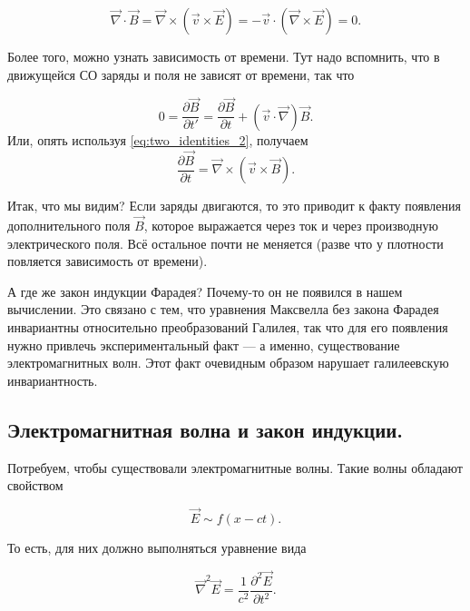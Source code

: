 \documentclass[12pt]{article}
\newcommand{\pt}{\partial}
\newcommand{\vn}{\vec{\nabla}}
\begin{document}
\begin{equation}
  \label{eq:B_field_div}
  \vn \cdot \vec{B} = \vn \times \left( \vec{v} \times \vec{E} \right)
  = - \vec{v} \cdot \left( \vn \times \vec{E} \right)=0.
\end{equation}

Более того, можно узнать зависимость от времени. Тут надо вспомнить,
что в движущейся СО заряды и поля не зависят от времени, так что

\begin{equation}
  \label{eq:B_field_pt_t}
  0=\frac{\pt \vec{B}}{\pt t'} = \frac{\pt \vec{B}}{\pt t} + \left( \vec{v}
    \cdot \vn \right) \vec{B}.
\end{equation}
Или, опять используя \eqref{eq:two_identities_2}, получаем
\begin{equation}
  \frac{\pt \vec{B}}{\pt t} = \vn \times \left( \vec{v} \times \vec{B} \right).
\end{equation}

Итак, что мы видим? Если заряды двигаются, то это приводит к факту
появления дополнительного поля $\vec{B}$, которое выражается через ток
и через производную электрического поля. Всё остальное почти не
меняется (разве что у плотности повляется зависимость от времени). 

А где же закон индукции Фарадея? Почему-то он не появился в нашем
вычислении. Это связано с тем, что уравнения Максвелла без закона
Фарадея инвариантны относительно преобразований Галилея, так что для
его появления нужно привлечь экспериментальный факт — а именно,
существование электромагнитных волн. Этот факт очевидным образом
нарушает галилеевскую инвариантность. 

\subsection{Электромагнитная волна и закон индукции.}
\label{em_wave}

Потребуем, чтобы существовали электромагнитные волны. Такие волны
обладают свойством

\begin{equation}
  \vec{E} \sim f (x-ct).
\end{equation}

То есть, для них должно выполняться уравнение вида

\begin{equation}
  \label{eq:wave_equation}
  \vn^2 \vec{E}  = \frac{1}{c^2}
  \frac{\pt^2\vec{E}}{\pt t^2}.
\end{equation}
\end{document}

